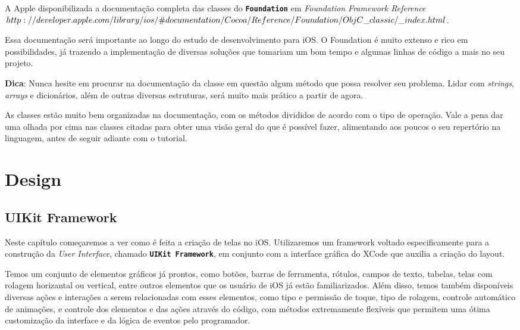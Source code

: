 \documentclass[a4paper,12pt,brazil,doubleside]{book}
\begin{document}
\begin{singlespace}
A Apple disponibilizada a documentação completa das classes do \texttt{\textbf{Foundation}} em
\emph{Foundation Framework Reference\\ \(http://developer.apple.com/library/ios/\#documentation/Cocoa/Reference/\\Foundation/ObjC\_classic/\_index.html\)}.

Essa documentação será importante ao longo do estudo de desenvolvimento para iOS. O Foundation é muito extenso e rico em possibilidades, já trazendo a implementação de diversas soluções que tomariam um bom tempo e algumas linhas de código a mais no seu projeto.

\begin{framed}

\textbf{Dica}: Nunca hesite em procurar na documentação da classe em questão algum método que possa resolver seu problema. Lidar com \textit{strings}, \textit{arrays} e dicionários, além de outras diversas estruturas, será muito mais prático a partir de agora.
\end{framed}


As classes estão muito bem organizadas na documentação, com os métodos divididos de acordo com o tipo de operação. Vale a pena dar uma olhada por cima nas classes citadas para obter uma visão geral do que é possível fazer, alimentando aos poucos o seu repertório na linguagem, antes de seguir adiante com o tutorial.


\chapter{Design}

\section{UIKit Framework}


Neste capítulo começaremos a ver como é feita a criação de telas no iOS. Utilizaremos um framework voltado especificamente para a construção da \emph{User Interface}, chamado \texttt{\textbf{UIKit Framework}}, em conjunto com a interface gráfica do XCode que auxilia a criação do layout.

Temos um conjunto de elementos gráficos já prontos, como botões, barras de ferramenta, rótulos, campos de texto, tabelas, telas com rolagem horizantal ou vertical, entre outros elementos que os usuário de iOS já estão familiarizados. Além disso, temos também disponíveis diversas ações e interações a serem relacionadas com esses elementos, como tipo e permissão de toque, tipo de rolagem, controle automático de animações, e controle dos elementos e das ações através do código, com métodos extremamente flexíveis que permitem uma ótima customização da interface e da lógica de eventos pelo programador.


\end{singlespace}
\end{document}
